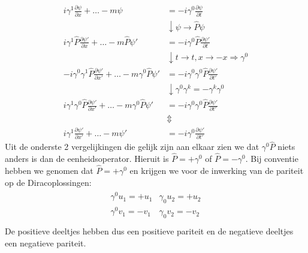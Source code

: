 \documentclass[../main.tex]{subfiles}
\begin{document}
\begin{equation}
    \begin{aligned}
        \label{eq:dirac_par}
        i\gamma^1 \frac{\partial \psi}{\partial x} + \dotsc -m\psi &= -i\gamma^0 \frac{\partial \psi}{\partial t} \\
                                                                   &\downarrow \psi \rightarrow \hat{P}\psi\\
        i\gamma^1 \hat{P} \frac{\partial \psi'}{\partial x} + \dotsc -m \hat{P} \psi' &= -i\gamma^0 \hat{P} \frac{\partial \psi'}{\partial t} \\
                                                                                      &\downarrow t\rightarrow t, x\rightarrow -x \Rightarrow \gamma^0\\
        -i\gamma^0\gamma^1 \hat{P} \frac{\partial \psi'}{\partial x'} + \dotsc -m \gamma^0 \hat{P} \psi' &= -i\gamma^0\gamma^0 \hat{P} \frac{\partial \psi'}{\partial t'} \\
                                                                                                         &\downarrow \gamma^0\gamma^k = -\gamma^k\gamma^0\\
        i\gamma^1\gamma^0 \hat{P} \frac{\partial \psi'}{\partial x'} + \dotsc -m \gamma^0 \hat{P} \psi' &= -i\gamma^0\gamma^0 \hat{P} \frac{\partial \psi'}{\partial t'} \\
                                                                                                       &\Updownarrow\\
        i\gamma^1 \frac{\partial \psi'}{\partial x'} + \dotsc -m\psi' &= -i\gamma^0 \frac{\partial \psi'}{\partial t'} 
    \end{aligned}
\end{equation}
Uit de onderste 2 vergelijkingen die gelijk zijn aan elkaar zien we dat $\gamma^0 \hat{P}$ niets anders is dan de eenheidsoperator. Hieruit is $\hat{P}=+\gamma^0$ of $\hat{P}=-\gamma^0$. Bij conventie hebben we genomen dat $\hat{P}=+\gamma^0$ en krijgen we voor de inwerking van de pariteit op de Diracoplossingen:
\begin{equation}
    \begin{aligned}
        \label{eq:par_dirac_opl}
        \begin{matrix}
            \gamma^0u_1 = +u_1 & \gamma_0u_2 = +u_2 \\
            \gamma^0v_1 = -v_1 & \gamma_0v_2 = -v_2 \\
        \end{matrix}
    \end{aligned}
\end{equation}
De positieve deeltjes hebben dus een positieve pariteit en de negatieve deeltjes een negatieve pariteit.
\end{document}

